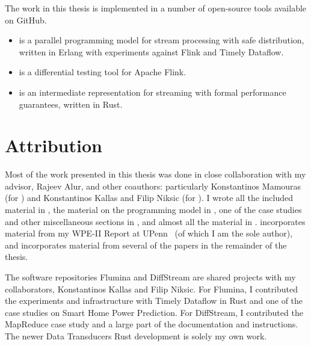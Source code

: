 The work in this thesis is implemented in a number of open-source tools available on GitHub.
\begin{samepage}
\begin{itemize}
\item {} is a parallel programming model for stream processing with safe distribution, written in Erlang with experiments against Flink and Timely Dataflow.
\item {} is a differential testing tool for Apache Flink.
\item {} is an intermediate representation for streaming with formal performance guarantees, written in Rust.
\end{itemize}
\end{samepage}

\section{Attribution}

Most of the work presented in this thesis was done in close collaboration with my advisor, Rajeev Alur, and other coauthors:
particularly Konstantinos Mamouras (for ) and Konstantinos Kallas and Filip Niksic (for ).
I wrote all the included material in , the material on the programming model in , one of the case studies and other miscellaneous sections in , and almost all the material in .
 incorporates material from my WPE-II Report at UPenn~ (of which I am the sole author), and  incorporates material from several of the papers in the remainder of the thesis.

The software repositories Flumina and DiffStream are shared projects with my collaborators, Konstantinos Kallas and Filip Niksic.
For Flumina, I contributed the experiments and infrastructure with Timely Dataflow in Rust and one of the case studies on Smart Home Power Prediction.
For DiffStream, I contributed the MapReduce case study and a large part of the documentation and instructions.
The newer Data Transducers Rust development is solely my own work.
